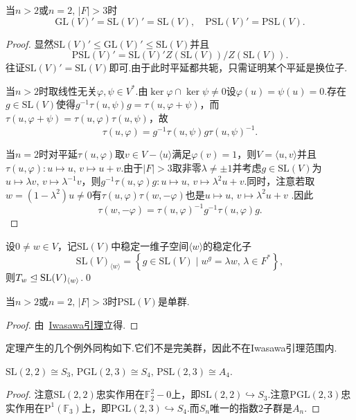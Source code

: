 \begin{prop}
	当$n>2$或$n=2,\,|F|>3$时
	\[
		\mathrm{GL}(V)'=\mathrm{SL}(V)'=\mathrm{SL}(V),\quad\mathrm{PSL}(V)'=\mathrm{PSL}(V).
	\]
\end{prop}
\begin{proof}
	显然$\mathrm{SL}(V)'\le\mathrm{GL}(V)'\le\mathrm{SL}(V)$并且
	\[
		\mathrm{PSL}(V)'=\mathrm{SL}(V)'Z(\mathrm{SL}(V))/Z(\mathrm{SL}(V)).
	\]
	往证$\mathrm{SL}(V)'=\mathrm{SL}(V)$即可.由于此时平延都共轭，只需证明某个平延是换位子.

	当$n>2$时取线性无关$\varphi,\psi\in V^*$.由$\ker\varphi\cap\ker\psi\ne 0$设$\varphi(u)=\psi(u)=0$.存在$g\in\mathrm{SL}(V)$使得$g^{-1}\tau(u,\psi)g=\tau(u,\varphi+\psi)$，而$\tau(u,\varphi+\psi)=\tau(u,\varphi)\tau(u,\psi)$，故
	\[
		\tau(u,\varphi)=g^{-1}\tau(u,\psi)g\tau(u,\psi)^{-1}.
	\]

	当$n=2$时对平延$\tau(u,\varphi)$取$v\in V-\langle u\rangle $满足$\varphi(v)=1$，则$V=\langle u,v\rangle $并且$\tau(u,\varphi)\colon u\mapsto u,\,v\mapsto u+v$.由于$|F|>3$取非零$\lambda\ne\pm 1$并考虑$g\in\mathrm{SL}(V)$为$u\mapsto\lambda v,\,v\mapsto\lambda^{-1}v$，则$g^{-1}\tau(u,\varphi)g\colon u\mapsto u,\,v\mapsto \lambda^2u+v$.同时，注意若取$w=(1-\lambda^2)u\ne 0$有$\tau(u,\varphi)\tau(w,-\varphi)$也是$u\mapsto u,\,v\mapsto\lambda^2u+v$	.因此
	\[
		\tau(w,-\varphi)=\tau(u,\varphi)^{-1}g^{-1}\tau(u,\varphi)g.
	\]
\end{proof}
\begin{lemma}
	设$0\ne w\in V$，记$\mathrm{SL}(V)$中稳定一维子空间$\langle w\rangle $的稳定化子
	\[
		\mathrm{SL}(V)_{\langle w\rangle}=\left\{g\in\mathrm{SL}(V)\mid w^g=\lambda w,\,\lambda\in F^*\right\},
	\]
	则$T_w\trianglelefteq\mathrm{SL}(V)_{\langle w\rangle }$.\qed
\end{lemma}
\begin{thm}
	当$n>2$或$n=2,\,|F|>3$时$\mathrm{PSL}(V)$是单群.
\end{thm}
\begin{proof}
	由~\hyperlink{lemma:Iwasawa}{Iwasawa引理}立得.
\end{proof}

定理产生的几个例外同构如下.它们不是完美群，因此不在Iwasawa引理范围内.
\begin{prop}
	$\mathrm{SL}(2,2)\cong S_3,\,\mathrm{PGL}(2,3)\cong S_4,\,\mathrm{PSL}(2,3)\cong A_4$.
\end{prop}
\begin{proof}
	注意$\mathrm{SL}(2,2)$忠实作用在$\mathbb{F}_2^2-0$上，即$\mathrm{SL}(2,2)\hookrightarrow S_3$.注意$\mathrm{PGL}(2,3)$忠实作用在$\bm{\mathrm{P}}^1(\mathbb{F}_3)$上，即$\mathrm{PGL}(2,3)\hookrightarrow S_4$.而$S_n$唯一的指数$2$子群是$A_n$.
\end{proof}

